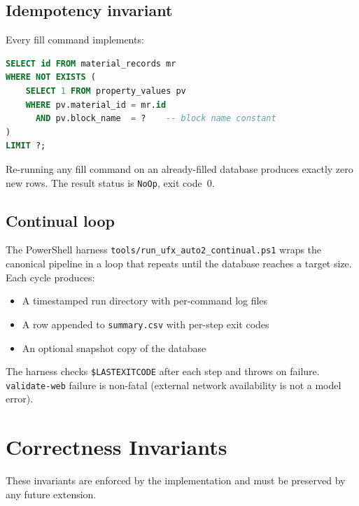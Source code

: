 \documentclass[11pt,letterpaper]{article}
\begin{document}
\subsection{Idempotency invariant}

Every fill command implements:

\begin{lstlisting}[language=SQL]
SELECT id FROM material_records mr
WHERE NOT EXISTS (
	SELECT 1 FROM property_values pv
	WHERE pv.material_id = mr.id
	  AND pv.block_name  = ?    -- block name constant
)
LIMIT ?;
\end{lstlisting}

Re-running any fill command on an already-filled database produces exactly
zero new rows.  The result status is \texttt{NoOp}, exit code~0.

\subsection{Continual loop}

The PowerShell harness \texttt{tools/run\_ufx\_auto2\_continual.ps1}
wraps the canonical pipeline in a loop that repeats until the database
reaches a target size.  Each cycle produces:

\begin{itemize}
  \item A timestamped run directory with per-command log files
  \item A row appended to \texttt{summary.csv} with per-step exit codes
  \item An optional snapshot copy of the database
\end{itemize}

The harness checks \texttt{\$LASTEXITCODE} after each step and throws
on failure.  \texttt{validate-web} failure is non-fatal (external
network availability is not a model error).

\section{Correctness Invariants}

These invariants are enforced by the implementation and must be preserved
by any future extension.
\end{document}
